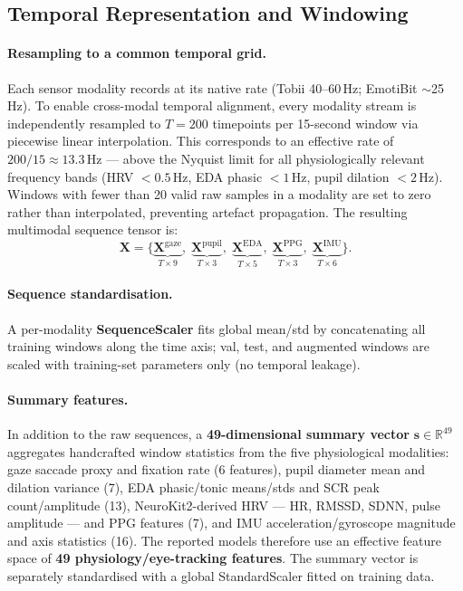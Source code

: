 \documentclass[sigconf,nonacm]{acmart}
\begin{document}
\subsection{Temporal Representation and Windowing}
\label{sec:temporal_repr}

\paragraph{Resampling to a common temporal grid.}
Each sensor modality records at its native rate (Tobii 40--60\,Hz;
EmotiBit $\sim$25\,Hz).
To enable cross-modal temporal alignment, every modality stream is
independently resampled to $T = 200$ timepoints per 15-second window
via piecewise linear interpolation.
This corresponds to an effective rate of $200/15 \approx 13.3$\,Hz ---
above the Nyquist limit for all physiologically relevant frequency bands
(HRV $< 0.5$\,Hz, EDA phasic $< 1$\,Hz, pupil dilation $< 2$\,Hz).
Windows with fewer than 20 valid raw samples in a modality are set to
zero rather than interpolated, preventing artefact propagation.
The resulting multimodal sequence tensor is:
\begin{equation}
  \mathbf{X} = \bigl\{
    \underbrace{\mathbf{X}^{\text{gaze}}}_{T\times 9},\;
    \underbrace{\mathbf{X}^{\text{pupil}}}_{T\times 3},\;
    \underbrace{\mathbf{X}^{\text{EDA}}}_{T\times 5},\;
    \underbrace{\mathbf{X}^{\text{PPG}}}_{T\times 3},\;
    \underbrace{\mathbf{X}^{\text{IMU}}}_{T\times 6}
  \bigr\}.
\end{equation}

\paragraph{Sequence standardisation.}
A per-modality \textbf{SequenceScaler} fits global mean/std by concatenating
all training windows along the time axis; val, test, and augmented windows are
scaled with training-set parameters only (no temporal leakage).

\paragraph{Summary features.}
In addition to the raw sequences, a \textbf{49-dimensional summary vector}
$\mathbf{s} \in \mathbb{R}^{49}$ aggregates handcrafted window statistics
from the five physiological modalities:
gaze saccade proxy and fixation rate (6 features),
pupil diameter mean and dilation variance (7),
EDA phasic/tonic means/stds and SCR peak count/amplitude (13),
NeuroKit2-derived HRV --- HR, RMSSD, SDNN, pulse amplitude --- and PPG features (7),
and IMU acceleration/gyroscope magnitude and axis statistics (16).
The reported models therefore use an effective feature space of
\textbf{49 physiology/eye-tracking features}.
The summary vector is separately standardised with a global
StandardScaler fitted on training data.
\end{document}
